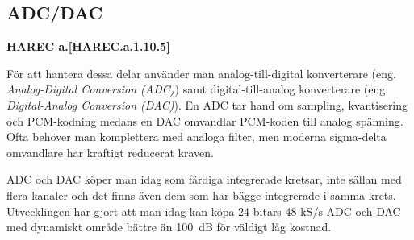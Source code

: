 \subsection{ADC/DAC}
\textbf{HAREC a.\ref{HAREC.a.1.10.5}\label{myHAREC.a.1.10.5}}

\begin{rev-nytt}[MAD]

För att hantera dessa delar använder man analog-till-digital konverterare
(eng. \emph{Analog-Digital Conversion (ADC)}) samt digital-till-analog
konverterare (eng. \emph{Digital-Analog Conversion (DAC)}). En ADC tar hand om
sampling, kvantisering och PCM-kodning medans en DAC omvandlar PCM-koden till
analog spänning. Ofta behöver man komplettera med analoga filter, men moderna
sigma-delta omvandlare har kraftigt reducerat kraven.

ADC och DAC köper man idag som färdiga integrerade kretsar, inte sällan med
flera kanaler och det finns även dem som har bägge integrerade i samma krets.
Utvecklingen har gjort att man idag kan köpa 24-bitars 48 kS/s ADC och DAC med
dynamiskt område bättre än 100~dB för väldigt låg kostnad.

\end{rev-nytt}
